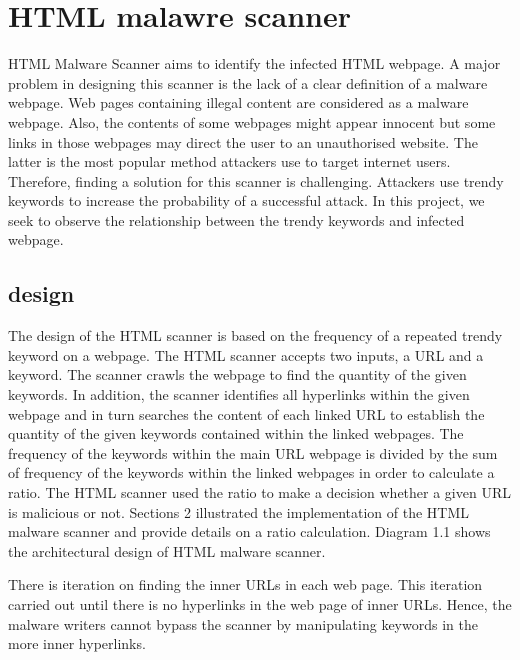 \section{HTML malawre scanner}

HTML Malware Scanner aims to identify the infected HTML webpage. A major problem in designing this scanner is the lack of a clear definition of a malware webpage. Web pages containing illegal content are considered as a malware webpage. Also, the contents of some webpages might appear innocent but some links in those webpages may direct the user to an unauthorised website. The latter is the most popular method attackers use to target internet users. Therefore, finding a solution for this scanner is challenging. Attackers use trendy keywords to increase the probability of a successful attack. In this project, we seek to observe the relationship between the trendy keywords and infected webpage.

\subsection{design}

The design of the HTML scanner is based on the frequency of a repeated trendy keyword on a webpage. The HTML scanner accepts two inputs, a URL and a keyword. The scanner crawls the webpage to find the quantity of the given keywords. In addition, the scanner identifies all hyperlinks within the given webpage and in turn searches the content of each linked URL to establish the quantity of the given keywords contained within the linked webpages. The frequency of the keywords within the main URL webpage is divided by the sum of frequency of the keywords within the linked webpages in order to calculate a ratio. The HTML scanner used the ratio to make a decision whether a given URL is malicious or not. Sections 2 illustrated the implementation of the HTML malware scanner and provide details on a ratio calculation. Diagram 1.1 shows the architectural design of HTML malware scanner.


There is iteration on finding the inner URLs in each web page. This iteration carried out until there is no hyperlinks in the web page of inner URLs. Hence, the malware writers cannot bypass the scanner by manipulating keywords in the more inner hyperlinks. 
